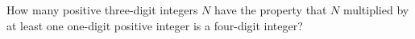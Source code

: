 How many positive three-digit integers $N$ have the property that $N$ multiplied by at least one one-digit positive integer is a four-digit integer?
